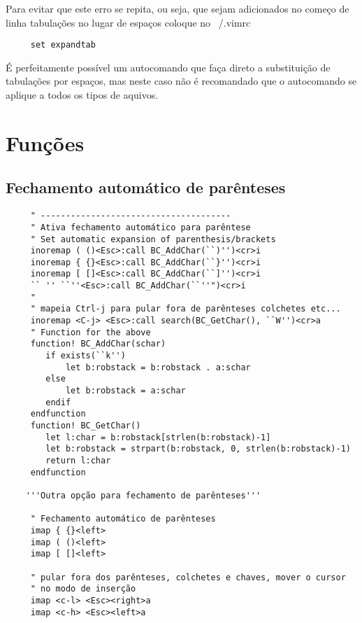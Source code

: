 Para evitar que este erro se repita, ou seja, que sejam 
adicionados no começo de linha tabulações no lugar de espaços
coloque no ~/.vimrc

\begin{verbatim}
     set expandtab
\end{verbatim}

É perfeitamente possível um autocomando que faça direto 
a substituição de tabulações por espaços, mas neste caso não 
é recomandado que o autocomando se aplique a todos os tipos de aquivos.


\section{Funções}
\label{sec:Funções}

\subsection{Fechamento automático de parênteses}
\label{sec:Fechamento automático de parênteses}

\begin{verbatim}
     " --------------------------------------
     " Ativa fechamento automático para parêntese
     " Set automatic expansion of parenthesis/brackets
     inoremap ( ()<Esc>:call BC_AddChar(``)'')<cr>i
     inoremap { {}<Esc>:call BC_AddChar(``}'')<cr>i
     inoremap [ []<Esc>:call BC_AddChar(``]'')<cr>i
     `` '' ``''<Esc>:call BC_AddChar(``''")<cr>i
     "
     " mapeia Ctrl-j para pular fora de parênteses colchetes etc...
     inoremap <C-j> <Esc>:call search(BC_GetChar(), ``W'')<cr>a
     " Function for the above
     function! BC_AddChar(schar)
        if exists(``k'')
            let b:robstack = b:robstack . a:schar
        else
            let b:robstack = a:schar
        endif
     endfunction
     function! BC_GetChar()
        let l:char = b:robstack[strlen(b:robstack)-1]
        let b:robstack = strpart(b:robstack, 0, strlen(b:robstack)-1)
        return l:char
     endfunction
    
    '''Outra opção para fechamento de parênteses'''
    
     " Fechamento automático de parênteses
     imap { {}<left>
     imap ( ()<left>
     imap [ []<left>
    
     " pular fora dos parênteses, colchetes e chaves, mover o cursor
     " no modo de inserção
     imap <c-l> <Esc><right>a
     imap <c-h> <Esc><left>a
\end{verbatim}

